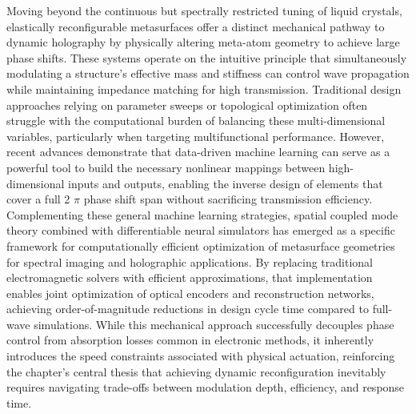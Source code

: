 Moving beyond the continuous but spectrally restricted tuning of liquid crystals, elastically reconfigurable metasurfaces offer a distinct mechanical pathway to dynamic holography by physically altering meta-atom geometry to achieve large phase shifts. These systems operate on the intuitive principle that simultaneously modulating a structure's effective mass and stiffness can control wave propagation while maintaining impedance matching for high transmission. Traditional design approaches relying on parameter sweeps or topological optimization often struggle with the computational burden of balancing these multi-dimensional variables, particularly when targeting multifunctional performance. However, recent advances demonstrate that data-driven machine learning can serve as a powerful tool to build the necessary nonlinear mappings between high-dimensional inputs and outputs, enabling the inverse design of elements that cover a full 2 \(\pi\) phase shift span without sacrificing transmission efficiency. Complementing these general machine learning strategies, spatial coupled mode theory combined with differentiable neural simulators has emerged as a specific framework for computationally efficient optimization of metasurface geometries for spectral imaging and holographic applications. By replacing traditional electromagnetic solvers with efficient approximations, that implementation enables joint optimization of optical encoders and reconstruction networks, achieving order-of-magnitude reductions in design cycle time compared to full-wave simulations. While this mechanical approach successfully decouples phase control from absorption losses common in electronic methods, it inherently introduces the speed constraints associated with physical actuation, reinforcing the chapter's central thesis that achieving dynamic reconfiguration inevitably requires navigating trade-offs between modulation depth, efficiency, and response time. \citep{doi_10_1016_j_matdes_2022_111560_e69e3350} \citep{doi_10_1021_acsphotonics_4c00171_f68cb79c} \citep{s2_76a83ea3baed75ad88b7f0782eb9a694a330c853_cee16cac}

